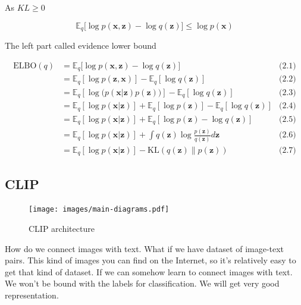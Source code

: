 As $KL \geq 0$

\begin{equation}
    \mathbb{E}_{q} \big[\log p(\mathbf{x}, \mathbf{z}) - \log q(\mathbf{z}) \big] \leq \log p(\mathbf{x})
\end{equation}

The left part called evidence lower bound

\begin{equation}
    \begin{aligned}
        \mathrm{ELBO}(q)
         & =\mathbb{E}_{q} \big[\log p(\mathbf{x}, \mathbf{z}) - \log q(\mathbf{z}) \big]                                                 & \text{(2.1)} \\
         & =\mathbb{E}_{q}[\log p(\mathbf{z}, \mathbf{x})] -\mathbb{E}_{q}[\log q(\mathbf{z})]                                            & \text{(2.2)} \\
         & =\mathbb{E}_{q}[\log \big( p(\mathbf{x} \vert \mathbf{z}) p(\mathbf{z}) \big) ] -\mathbb{E}_{q}[\log q(\mathbf{z})]            & \text{(2.3)} \\
         & =\mathbb{E}_{q}[\log p(\mathbf{x} \vert \mathbf{z})] + \mathbb{E}_{q}[\log p(\mathbf{z})] - \mathbb{E}_{q}[\log q(\mathbf{z})] & \text{(2.4)} \\
         & =\mathbb{E}_{q}[\log p(\mathbf{x} \vert\mathbf{z})] + \mathbb{E}_{q}[\log p(\mathbf{z}) - \log q(\mathbf{z})]                  & \text{(2.5)} \\
         & =\mathbb{E}_{q}[\log p(\mathbf{x} \vert \mathbf{z})] + \int q(\mathbf{z}) \log \frac{p(\mathbf{z})}{q(\mathbf{z})} d\mathbf{z} & \text{(2.6)} \\
         & =\mathbb{E}_{q}[\log p(\mathbf{x} \vert \mathbf{z})]- \text{KL}(q(\mathbf{z}) \| p(\mathbf{z}))                                & \text{(2.7)}
    \end{aligned}
\end{equation}

\subsection{CLIP}
\begin{figure}[h]
    \centering
    \texttt{[image: images/main-diagrams.pdf]}
    \caption{CLIP architecture}
    \label{fig:clip_main_diagram}
\end{figure}

How do we connect images with text. What if we have dataset of image-text pairs.
This kind of images you can find on the Internet, so it's relatively easy to get that kind of dataset.
If we can somehow learn to connect images with text. We won't be bound with the labels for classification.
We will get very good representation.

